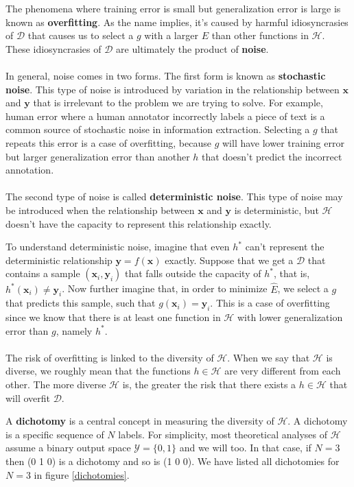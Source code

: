 The phenomena where training error is small but generalization error is large is known as \textbf{overfitting}. As the name implies, it's caused by harmful idiosyncrasies of $\mathcal{D}$ that causes us to select a $g$ with a larger $E$ than other functions in $\mathcal{H}$. These idiosyncrasies of $\mathcal{D}$ are ultimately the product of \textbf{noise}.
\\\\
In general, noise comes in two forms. The first form is known as \textbf{stochastic noise}. This type of noise is introduced by variation in the relationship between $\mathbf{x}$ and $\mathbf{y}$ that is irrelevant to the problem we are trying to solve. For example, human error where a human annotator incorrectly labels a piece of text is a common source of stochastic noise in information extraction. Selecting a $g$ that repeats this error is a case of overfitting, because $g$ will have lower training error but larger generalization error than another $h$ that doesn't predict the incorrect annotation.
\\\\
The second type of noise is called \textbf{deterministic noise}. This type of noise may be introduced when the relationship between $\mathbf{x}$ and $\mathbf{y}$ is deterministic, but $\mathcal{H}$ doesn't have the capacity to represent this relationship exactly.

To understand deterministic noise, imagine that even $h^*$ can't represent the deterministic relationship $\mathbf{y} = f(\mathbf{x})$ exactly. Suppose that we get a $\mathcal{D}$ that contains a sample $(\mathbf{x}_i, \mathbf{y}_i)$ that falls outside the capacity of $h^*$, that is, $h^*(\mathbf{x}_i) \neq \mathbf{y}_i$. Now further imagine that, in order to minimize $\hat{E}$, we select a $g$ that predicts this sample, such that $g(\mathbf{x}_i) = \mathbf{y}_i$. This is a case of overfitting since we know that there is at least one function in $\mathcal{H}$ with lower generalization error than $g$, namely $h^*$.
\\\\
The risk of overfitting is linked to the diversity of $\mathcal{H}$. When we say that $\mathcal{H}$ is diverse, we roughly mean that the functions $h \in \mathcal{H}$ are very different from each other. The more diverse $\mathcal{H}$ is, the greater the risk that there exists a $h \in \mathcal{H}$ that will overfit $\mathcal{D}$.

A \textbf{dichotomy} is a central concept in measuring the diversity of $\mathcal{H}$. A dichotomy is a specific sequence of $N$ labels. For simplicity, most theoretical analyses of $\mathcal{H}$ assume a binary output space $\mathcal{Y} = \{0, 1\}$ and we will too. In that case, if $N = 3$ then (0 1 0) is a dichotomy and so is (1 0 0). We have listed all dichotomies for $N = 3$ in figure \ref{dichotomies}.

